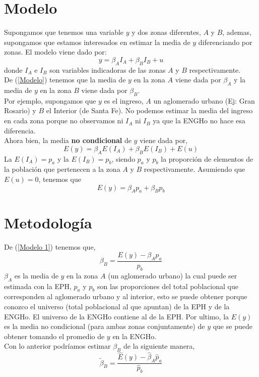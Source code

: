 \documentclass[11pt,spanish]{article}
\begin{document}
\section{Modelo}
Supongamos que tenemos una variable $y$ y dos zonas diferentes, $A$ y $B$, ademas, supongamos que estamos interesados en estimar la media de $y$ diferenciando por zonas. El modelo viene dado por:\\
\begin{equation}\label{Modelo}
y=\beta_{A}I_{A}+\beta_{B}I_{B}+u
\end{equation}
donde $I_{A}$ e $I_{B}$ son variables indicadoras de las zonas $A$ y $B$ respectivamente.\\
De (\ref{Modelo}) tenemos que la media de $y$ en la zona $A$ viene dada por $\beta_{A}$ y la media de $y$ en la zona $B$ viene dada por $\beta_{B}$.\\
Por ejemplo, supongamos que $y$ es el ingreso, $A$ un aglomerado urbano (Ej: Gran Rosario) y $B$ el Interior (de Santa Fe). No podemos estimar la media del ingreso en cada zona porque no observamos ni $I_{A}$ ni $I_{B}$ ya que la ENGHo no hace esa diferencia.\\
Ahora bien, la media \textbf{no condicional} de $y$ viene dada por,
\begin{equation*}
E(y)=\beta_{A}E(I_{A})+\beta_{B}E(I_{B})+E(u)
\end{equation*}
La $E(I_{A})=p_{a}$ y la $E(I_{B})=p_{b}$, siendo $p_{a}$ y $p_{b}$ la proporción de elementos de la población que pertenecen a la zona $A$ y $B$ respectivamente. Asumiendo que  $E(u)=0$, tenemos que
\begin{equation}\label{Modelo 1}
E(y)=\beta_{A}p_{a}+\beta_{B}p_{b}
\end{equation}

\section{Metodología}
De (\ref{Modelo 1}) tenemos que,
\begin{equation*}
\beta_{B}= \dfrac{E(y)-\beta_{A}p_{a}}{p_{b}}
\end{equation*}
$\beta_{A}$ es la media de $y$ en la zona $A$ (un aglomerado urbano) la cual puede ser estimada con la EPH, $p_{a}$ y $p_{b}$ son las proporciones del total poblacional  que corresponden al aglomerado urbano y al interior, esto se puede obtener porque conozco el universo (total poblacional al que apuntan) de la EPH y de la ENGHo. El universo de la ENGHo contiene al de la EPH. Por ultimo, la $E(y)$ es la media no condicional (para ambas zonas conjuntamente) de $y$ que se puede obtener tomando el promedio de $y$ en la ENGHo. \\
Con lo anterior podríamos estimar $\beta_{B}$ de la siguiente manera,
\begin{equation}\label{estimador}
\tilde{\beta}_{B}= \dfrac{\hat{E}(y)-\hat{\beta}_{A}\hat{p}_{a}}{\hat{p}_{b}}
\end{equation}
\end{document}
